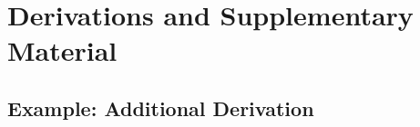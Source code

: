 \chapter{Derivations and Supplementary Material}
\label{app:derivations}


\section{Example: Additional Derivation}

